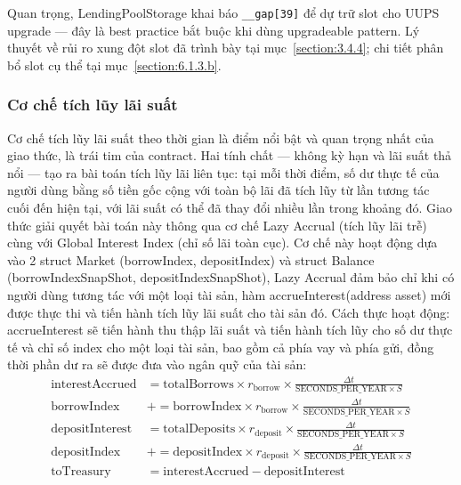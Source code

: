 \documentclass[../DoAn.tex]{subfiles}
\begin{document}
Quan trọng, LendingPoolStorage khai báo \mbox{\texttt{\_\_gap[39]}} để dự trữ slot cho UUPS upgrade --- đây là best practice bắt buộc khi dùng upgradeable pattern. Lý thuyết về rủi ro xung đột slot đã trình bày tại mục~\ref{section:3.4.4}; chi tiết phân bổ slot cụ thể tại mục~\ref{section:6.1.3.b}.

\subsubsection{Cơ chế tích lũy lãi suất}
\label{section:4.2.1.b}


Cơ chế tích lũy lãi suất theo thời gian là điểm nổi bật và quan trọng nhất của giao thức, là trái tim của contract. Hai tính chất --- không kỳ hạn và lãi suất thả nổi --- tạo ra bài toán tích lũy lãi liên tục: tại mỗi thời điểm, số dư thực tế của người dùng bằng số tiền gốc cộng với toàn bộ lãi đã tích lũy từ lần tương tác cuối đến hiện tại, với lãi suất có thể đã thay đổi nhiều lần trong khoảng đó. Giao thức giải quyết bài toán này thông qua cơ chế Lazy Accrual (tích lũy lãi trễ) cùng với Global Interest Index (chỉ số lãi toàn cục). Cơ chế này hoạt động dựa vào 2 struct Market (borrowIndex, depositIndex) và struct Balance (borrowIndexSnapShot, depositIndexSnapShot), Lazy Accrual đảm bảo chỉ khi có người dùng tương tác với một loại tài sản, hàm accrueInterest(address asset) mới được thực thi và tiến hành tích lũy lãi suất cho tài sản đó. Cách thực hoạt động: accrueInterest sẽ tiến hành thu thập lãi suất và tiến hành tích lũy cho số dư thực tế và chỉ số index cho một loại tài sản, bao gồm cả phía vay và phía gửi, đồng thời phần dư ra sẽ được đưa vào ngân quỹ của tài sản:
\begin{align}
\mathrm{interestAccrued} &= \mathrm{totalBorrows} \times r_{\mathrm{borrow}} \times \frac{\Delta t}{\mathrm{SECONDS\_PER\_YEAR} \times S} \label{eq:interest_accrued} \\
\mathrm{borrowIndex} &\mathrel{+}= \mathrm{borrowIndex} \times r_{\mathrm{borrow}} \times \frac{\Delta t}{\mathrm{SECONDS\_PER\_YEAR} \times S} \label{eq:borrow_index} \\
\mathrm{depositInterest} &= \mathrm{totalDeposits} \times r_{\mathrm{deposit}} \times \frac{\Delta t}{\mathrm{SECONDS\_PER\_YEAR} \times S} \label{eq:deposit_interest} \\
\mathrm{depositIndex} &\mathrel{+}= \mathrm{depositIndex} \times r_{\mathrm{deposit}} \times \frac{\Delta t}{\mathrm{SECONDS\_PER\_YEAR} \times S} \label{eq:deposit_index} \\
\mathrm{toTreasury} &= \mathrm{interestAccrued} - \mathrm{depositInterest} \label{eq:to_treasury}
\end{align}
\end{document}
